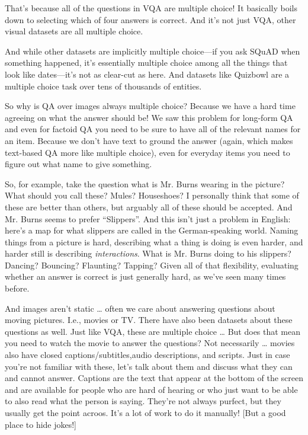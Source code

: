 That’s because all of the questions in VQA are multiple choice!  It basically boils down to selecting which of four answers is correct.  And it’s not just VQA, other visual datasets are all multiple choice.  

And while other datasets are implicitly multiple choice—if you ask SQuAD when something happened, it’s essentially multiple choice among all the things that look like dates—it’s not as clear-cut as here.  And datasets like Quizbowl are a multiple choice task over tens of thousands of entities.  

So why is QA over images always multiple choice?  Because we have a hard time agreeing on what the answer should be!  We saw this problem for long-form QA and even for factoid QA you need to be sure to have all of the relevant names for an item.  Because we don’t have text to ground the answer (again, which makes text-based QA more like multiple choice), even for everyday items you need to figure out what name to give something. 

So, for example, take the question what is Mr. Burns wearing in the picture?  What should you call these?  Mules?  Houseshoes?  I personally think that some of these are better than others, but arguably all of these should be accepted.  And Mr. Burns seems to prefer “Slippers”.  And this isn’t just a problem in English: here’s a map for what slippers are called in the German-speaking world.  Naming things from a picture is hard, describing what a thing is doing is even harder, and harder still is describing \emph{interactions}.  What is Mr. Burns doing to his slippers?  Dancing? Bouncing? Flaunting? Tapping?  Given all of that flexibility, evaluating whether an answer is correct is just generally hard, as we’ve seen many times before.

And images aren’t static … often we care about answering questions about moving pictures.  I.e., movies or TV.  There have also been datasets about these questions as well.  Just like VQA, these are multiple choice … But does that mean you need to watch the movie to answer the questions?  Not necessarily … movies also have closed captions/subtitles,audio descriptions, and scripts.  Just in case you’re not familiar with these, let’s talk about them and discuss what they can and cannot answer.
Captions are the text that appear at the bottom of the screen and are available for people who are hard of hearing or who just want to be able to also read what the person is saying.  They’re not always purfect, but they usually get the point acroos.  It’s a lot of work to do it manually!  [But a good place to hide jokes!]

